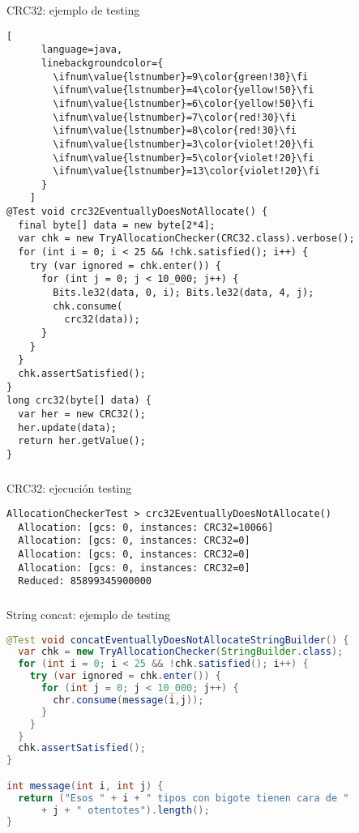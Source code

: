 \begin{frame}[fragile]
  \begin{block}{CRC32: ejemplo de testing}
    \begin{lstlisting}[
      language=java,
      linebackgroundcolor={
        \ifnum\value{lstnumber}=9\color{green!30}\fi
        \ifnum\value{lstnumber}=4\color{yellow!50}\fi
        \ifnum\value{lstnumber}=6\color{yellow!50}\fi
        \ifnum\value{lstnumber}=7\color{red!30}\fi
        \ifnum\value{lstnumber}=8\color{red!30}\fi
        \ifnum\value{lstnumber}=3\color{violet!20}\fi
        \ifnum\value{lstnumber}=5\color{violet!20}\fi
        \ifnum\value{lstnumber}=13\color{violet!20}\fi
      }
    ]
@Test void crc32EventuallyDoesNotAllocate() {
  final byte[] data = new byte[2*4];
  var chk = new TryAllocationChecker(CRC32.class).verbose();
  for (int i = 0; i < 25 && !chk.satisfied(); i++) {
    try (var ignored = chk.enter()) {
      for (int j = 0; j < 10_000; j++) {
        Bits.le32(data, 0, i); Bits.le32(data, 4, j);
        chk.consume(
          crc32(data));
      }
    }
  }
  chk.assertSatisfied();
}
long crc32(byte[] data) {
  var her = new CRC32();
  her.update(data);
  return her.getValue();
}
    \end{lstlisting}
  \end{block}
\end{frame}

\begin{frame}[fragile]
  \frametitle{\ft}
  \begin{block}{CRC32: ejecución testing}
    \begin{lstlisting}
AllocationCheckerTest > crc32EventuallyDoesNotAllocate()
  Allocation: [gcs: 0, instances: CRC32=10066]
  Allocation: [gcs: 0, instances: CRC32=0]
  Allocation: [gcs: 0, instances: CRC32=0]
  Allocation: [gcs: 0, instances: CRC32=0]
  Reduced: 85899345900000
    \end{lstlisting}
  \end{block}
\end{frame}


\begin{frame}[fragile]
  \frametitle{\ft}
  \begin{block}{String concat: ejemplo de testing}
    \begin{lstlisting}[language=java]
@Test void concatEventuallyDoesNotAllocateStringBuilder() {
  var chk = new TryAllocationChecker(StringBuilder.class);
  for (int i = 0; i < 25 && !chk.satisfied(); i++) {
    try (var ignored = chk.enter()) {
      for (int j = 0; j < 10_000; j++) {
        chr.consume(message(i,j));
      }
    }
  }
  chk.assertSatisfied();
}

int message(int i, int j) {
  return ("Esos " + i + " tipos con bigote tienen cara de "
      + j + " otentotes").length();
}
    \end{lstlisting}
  \end{block}
\end{frame}

